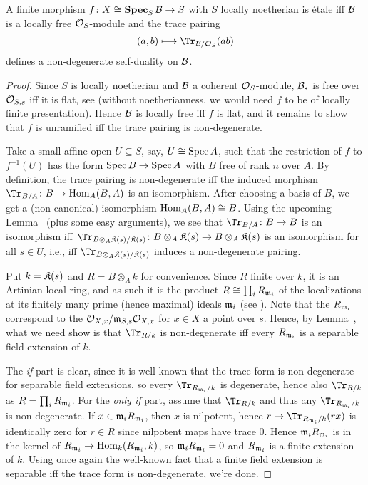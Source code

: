\documentclass[a4paper,parskip=half,numbers=enddot, DIV=12]{scrreprt}
\begin{document}
\begin{prop}
	A finite morphism $f\colon X\cong \SPEC_S\Bb\morphism S$ with $S$ locally noetherian is étale iff $\mathcal{B}$ is a locally free $\mathcal{O}_S$-module and the trace pairing
	\begin{align*}
		(a,b)\longmapsto \Tr_{\Bb/\Oo_S}(ab)
	\end{align*}
	defines a non-degenerate self-duality on $\mathcal{B}$.
\end{prop}
\begin{proof}
	Since $S$ is locally noetherian and $\mathcal{B}$ a coherent $\mathcal{O}_S$-module, $\mathcal{B}_s$ is free over $\mathcal{O}_{S,s}$ iff it is flat, see \cite[Proposition~1.3.1]{homalg} (without noetherianness, we would need $f$ to be of locally finite presentation). Hence $\mathcal{B}$ is locally free iff $f$ is flat, and it remains to show that $f$ is unramified iff the trace pairing is non-degenerate.
	
	Take a small affine open $U\subseteq S$, say, $U\cong\operatorname{Spec} A$, such that the restriction of $f$ to $f^{-1}(U)$ has the form $\Spec B\morphism \Spec A$ with $B$ free of rank $n$ over $A$. By definition, the trace pairing is non-degenerate iff the induced morphism $\Tr_{B/A}\colon B\morphism \Hom_A(B,A)$ is an isomorphism. After choosing a basis of $B$, we get a (non-canonical) isomorphism $\operatorname{Hom}_A(B,A)\cong B$. Using the upcoming Lemma~ (plus some easy arguments), we see that $\Tr_{B/A}\colon B\morphism B$ is an isomorphism iff $\Tr_{B\otimes_A\KK(s)/\KK(s)}\colon B\otimes_A\KK(s)\morphism B\otimes_A\KK(s)$ is an isomorphism for all $s\in U$, i.e., iff $\Tr_{B\otimes_A\KK(s)/\KK(s)}$ induces a non-degenerate pairing.
	
	Put $k=\mathfrak{K}(s)$ and $R=B\otimes_Ak$ for convenience. Since $R$ finite over $k$, it is an Artinian local ring, and as such it is the product $R\cong \prod_iR_{\mathfrak{m}_i}$ of the localizations at its finitely many prime (hence maximal) ideals $\mathfrak{m}_i$ (see \cite[Corollary~2.16]{eisenbudCommAlg}). Note that the $R_{\mathfrak{m}_i}$ correspond to the $\mathcal{O}_{X,x}/\mathfrak{m}_{S,s}\mathcal{O}_{X,x}$ for $x\in X$ a point over $s$. Hence, by Lemma~, what we need show is that $\Tr_{R/k}$ is non-degenerate iff every $R_{\mathfrak{m}_i}$ is a separable field extension of $k$.
	
	The \emph{if} part is clear, since it is well-known that the trace form is non-degenerate for separable field extensions, so every $\Tr_{R_{\mm_i}/k}$ is degenerate, hence also $\Tr_{R/k}$ as $R=\prod_iR_{\mathfrak{m}_i}$. For the \emph{only if} part, assume that $\Tr_{R/k}$ and thus any $\Tr_{R_{\mm_i}/k}$ is non-degenerate. If $x\in\mathfrak{m}_iR_{\mathfrak{m}_i}$, then $x$ is nilpotent, hence $r\mapsto\Tr_{R_{\mm_i}/k}(rx)$ is identically zero for $r\in R$ since nilpotent maps have trace $0$. Hence $\mathfrak{m}_iR_{\mathfrak{m}_i}$ is in the kernel of $R_{\mm_i}\morphism\Hom_k(R_{\mm_i},k)$, so $\mathfrak{m}_iR_{\mathfrak{m}_i}=0$ and $R_{\mathfrak{m}_i}$ is a finite extension of $k$. Using once again the well-known fact that a finite field extension is separable iff the trace form is non-degenerate, we're done.
\end{proof}
\end{document}
